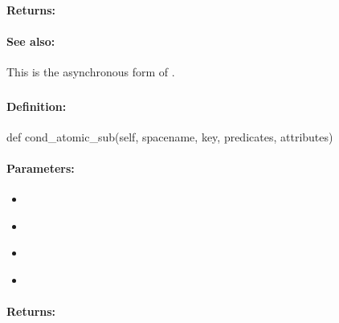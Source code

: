 \paragraph{Returns:}


\paragraph{See also:}  This is the asynchronous form of .

\pagebreak
\subsubsection{}
\label{api:python:cond_atomic_sub}


\paragraph{Definition:}
\begin{pythoncode}
def cond_atomic_sub(self, spacename, key, predicates, attributes)
\end{pythoncode}

\paragraph{Parameters:}
\begin{itemize}[noitemsep]
\item {}\\

\item {}\\

\item {}\\

\item {}\\

\end{itemize}

\paragraph{Returns:}


